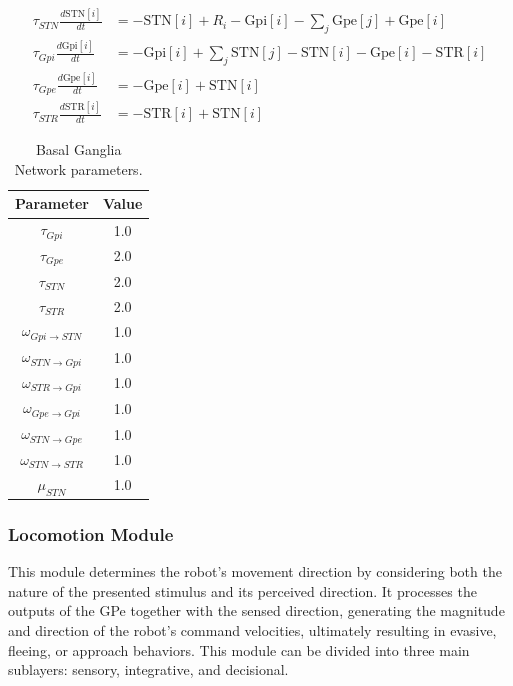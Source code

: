 \documentclass[preprint,12pt]{elsarticle}
\begin{document}
\begin{align}
\tau_{STN}\frac{d \text{STN}[i]}{dt} &= -\text{STN}[i] + R_i - \text{Gpi}[i] - \sum_{j} \text{Gpe}[j] + \text{Gpe}[i]\label{eq:stn} \\
\tau_{Gpi}\frac{d \text{Gpi}[i]}{dt} &= - \text{Gpi}[i] + \sum_{j} \text{STN}[j]-\text{STN}[i] - \text{Gpe}[i] - \text{STR}[i]\\
\tau_{Gpe}\frac{d \text{Gpe}[i]}{dt} &= - \text{Gpe}[i] + \text{STN}[i] \\
\tau_{STR}\frac{d \text{STR}[i]}{dt} &= - \text{STR}[i] + \text{STN}[i]
\label{eq:str}
\end{align}

\begin{table}[t]
\centering
\caption{Basal Ganglia Network parameters.}
\begin{tabular}{|c|c|}
\hline
\textbf{Parameter} & \textbf{Value} \\ \hline
$\tau_{Gpi}$ & 1.0 \\ \hline
$\tau_{Gpe}$ & 2.0 \\ \hline
$\tau_{STN}$ & 2.0 \\ \hline
$\tau_{STR}$ & 2.0 \\ \hline
$\omega_{Gpi\rightarrow STN}$ & 1.0 \\ \hline
$\omega_{STN\rightarrow Gpi}$ & 1.0 \\ \hline
$\omega_{STR\rightarrow Gpi}$ & 1.0 \\ \hline
$\omega_{Gpe\rightarrow Gpi}$ & 1.0 \\ \hline
$\omega_{STN\rightarrow Gpe}$ & 1.0 \\ \hline
$\omega_{STN\rightarrow STR}$ & 1.0 \\ \hline
$\mu_{STN}$ & 1.0 \\ \hline
\end{tabular}
\label{table:Ganglia}
\end{table}

\subsubsection{Locomotion Module}

This module determines the robot’s movement direction by considering both the nature of the presented stimulus and its perceived direction. It processes the outputs of the GPe together with the sensed direction, generating the magnitude and direction of the robot’s command velocities, ultimately resulting in evasive, fleeing, or approach behaviors. This module can be divided into three main sublayers: sensory, integrative, and decisional. 
\end{document}
